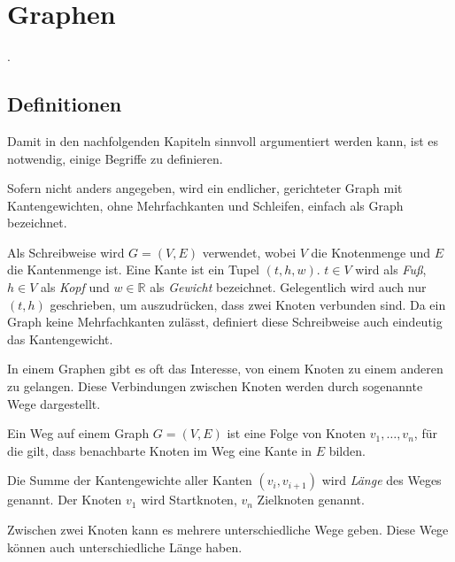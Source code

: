 \chapter{Graphen}

.

\section{Definitionen}
Damit in den nachfolgenden Kapiteln sinnvoll argumentiert werden kann, ist es notwendig, einige Begriffe zu definieren.

\begin{definition}[Graph]
    Sofern nicht anders angegeben, wird ein endlicher, gerichteter Graph mit Kantengewichten, ohne Mehrfachkanten und Schleifen, einfach als Graph bezeichnet.

    Als Schreibweise wird $G = (V, E)$ verwendet, wobei $V$ die Knotenmenge und $E$ die Kantenmenge ist. Eine Kante ist ein Tupel $(t, h, w)$. $t \in V$ wird als \emph{Fuß}, $h \in V$ als \emph{Kopf} und $w \in \mathbb{R}$ als \emph{Gewicht} bezeichnet. Gelegentlich wird auch nur $(t, h)$ geschrieben, um auszudrücken, dass zwei Knoten verbunden sind. Da ein Graph keine Mehrfachkanten zulässt, definiert diese Schreibweise auch eindeutig das Kantengewicht.
\end{definition}

In einem Graphen gibt es oft das Interesse, von einem Knoten zu einem anderen zu gelangen.
Diese Verbindungen zwischen Knoten werden durch sogenannte Wege dargestellt.

\begin{definition}[Weg]
    Ein Weg auf einem Graph $G = (V, E)$ ist eine Folge von Knoten $v_1, \dotsc, v_n$, für die gilt, dass benachbarte Knoten im Weg eine Kante in $E$ bilden.


    Die Summe der Kantengewichte aller Kanten $(v_i, v_{i + 1})$ wird \emph{Länge} des Weges genannt. Der Knoten $v_1$ wird Startknoten, $v_n$ Zielknoten genannt.
\end{definition}

Zwischen zwei Knoten kann es mehrere unterschiedliche Wege geben.
Diese Wege können auch unterschiedliche Länge haben.

